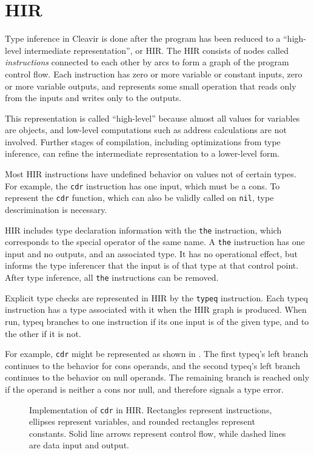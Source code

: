 \section{HIR}
\label{sec-hir}

Type inference in Cleavir is done after the program has been reduced
to a ``high-level intermediate representation'', or HIR. The HIR
consists of nodes called \textit{instructions} connected to each other
by arcs to form a graph of the program control flow. Each instruction
has zero or more variable or constant inputs, zero or more
variable outputs, and represents some small operation that reads
only from the inputs and writes only to the outputs.

This representation is called ``high-level'' because almost all values
for variables are \commonlisp{} objects, and low-level computations
such as address calculations are not involved. Further stages of
compilation, including optimizations from type inference, can refine
the intermediate representation to a lower-level form.

Most HIR instructions have undefined behavior on values not of certain
types. For example, the \texttt{cdr} instruction has one input, which
must be a cons. To represent the \commonlisp{} \texttt{cdr} function,
which can also be validly called on \texttt{nil}, type descrimination
is necessary.

HIR includes type declaration information with the \texttt{the}
instruction, which corresponds to the \commonlisp{} special operator
of the same name. A \texttt{the} instruction has one input and no
outputs, and an associated type. It has no operational effect, but
informs the type inferencer that the input is of that type at that
control point. After type inference, all \texttt{the} instructions can
be removed.

Explicit type checks are represented in HIR by the \texttt{typeq}
instruction. Each typeq instruction has a type associated with it when
the HIR graph is produced. When run, typeq branches to one instruction
if its one input is of the given type, and to the other if it is not.

For example, \texttt{cdr} might be represented as shown in
.  The first typeq's left branch continues to the
behavior for cons operands, and the second typeq's left branch
continues to the behavior on null operands. The remaining branch is
reached only if the operand is neither a cons nor null, and therefore
signals a type error.

\begin{figure}
\begin{center}
\end{center}
\caption{\label{fig-cdr}
Implementation of \texttt{cdr} in HIR. Rectangles represent instructions, ellipses represent variables, and rounded rectangles represent constants. Solid line arrows represent control flow, while dashed lines are data input and output.}
\end{figure}
